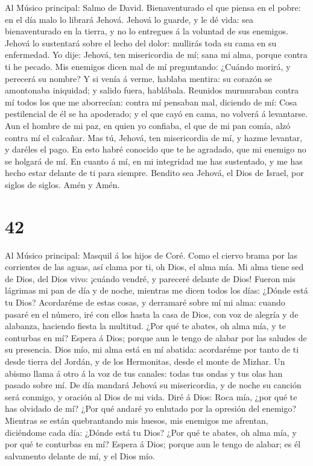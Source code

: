  Al Músico principal: Salmo de David. Bienaventurado el
que piensa en el pobre: en el día malo lo librará Jehová. 
Jehová lo guarde, y le dé vida: sea bienaventurado en la tierra, y no lo
entregues á la voluntad de sus enemigos.  Jehová lo
sustentará sobre el lecho del dolor: mullirás toda su cama en su
enfermedad.  Yo dije: Jehová, ten misericordia de mí; sana
mi alma, porque contra ti he pecado.  Mis enemigos dicen
mal de mí preguntando: ¿Cuándo morirá, y perecerá su nombre?
 Y si venía á verme, hablaba mentira: su corazón se
amontonaba iniquidad; y salido fuera, hablábala.  Reunidos
murmuraban contra mí todos los que me aborrecían: contra mí pensaban
mal, diciendo de mí:  Cosa pestilencial de él se ha
apoderado; y el que cayó en cama, no volverá á levantarse.
 Aun el hombre de mi paz, en quien yo confiaba, el que de
mi pan comía, alzó contra mí el calcañar.  Mas tú,
Jehová, ten misericordia de mí, y hazme levantar, y daréles el pago.
 En esto habré conocido que te he agradado, que mi
enemigo no se holgará de mí.  En cuanto á mí, en mi
integridad me has sustentado, y me has hecho estar delante de ti para
siempre.  Bendito sea Jehová, el Dios de Israel, por
siglos de siglos. Amén y Amén.

\hypertarget{section-41}{%
\section{42}\label{section-41}}

 Al Músico principal: Masquil á los hijos de Coré. Como el
ciervo brama por las corrientes de las aguas, así clama por ti, oh Dios,
el alma mía.  Mi alma tiene sed de Dios, del Dios vivo:
¡cuándo vendré, y pareceré delante de Dios!  Fueron mis
lágrimas mi pan de día y de noche, mientras me dicen todos los días:
¿Dónde está tu Dios?  Acordaréme de estas cosas, y
derramaré sobre mí mi alma: cuando pasaré en el número, iré con ellos
hasta la casa de Dios, con voz de alegría y de alabanza, haciendo fiesta
la multitud.  ¿Por qué te abates, oh alma mía, y te
conturbas en mí? Espera á Dios; porque aun le tengo de alabar por las
saludes de su presencia.  Dios mío, mi alma está en mí
abatida: acordaréme por tanto de ti desde tierra del Jordán, y de los
Hermonitas, desde el monte de Mizhar.  Un abismo llama á
otro á la voz de tus canales: todas tus ondas y tus olas han pasado
sobre mí.  De día mandará Jehová su misericordia, y de
noche su canción será conmigo, y oración al Dios de mi vida.
 Diré á Dios: Roca mía, ¿por qué te has olvidado de mí?
¿Por qué andaré yo enlutado por la opresión del enemigo? 
Mientras se están quebrantando mis huesos, mis enemigos me afrentan,
diciéndome cada día: ¿Dónde está tu Dios?  ¿Por qué te
abates, oh alma mía, y por qué te conturbas en mí? Espera á Dios; porque
aun le tengo de alabar; es él salvamento delante de mí, y el Dios mío.

